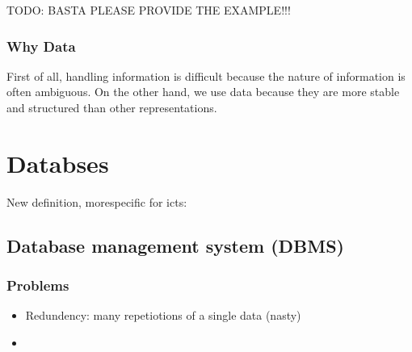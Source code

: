 TODO: BASTA PLEASE PROVIDE THE EXAMPLE!!! 

\subsubsection{Why Data}
First of all, handling information is difficult because the nature of information is often ambiguous. On the other hand, we use data because they are more stable and structured than other representations.

\section{Databses}
New definition, morespecific for icts:


\subsection{Database management system (DBMS)}

\subsubsection{Problems}
\begin{itemize}
    \item Redundency: many repetiotions of a single data (nasty)
    \item 
\end{itemize}
